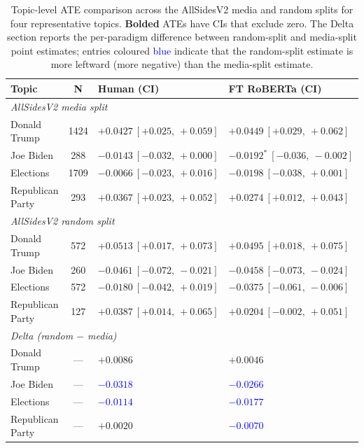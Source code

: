 \begin{table}[ht]
  \centering
  \small
  \begin{tabular}{l c l l}
    \toprule
    \textbf{Topic} & \textbf{N} & \textbf{Human (CI)} & \textbf{FT RoBERTa (CI)} \\
    \midrule
    \multicolumn{4}{l}{\textit{AllSidesV2 media split}} \\
    Donald Trump     & \num{1424} & $\mathbf{+0.0427}\ [+0.025,\ +0.059]$ & $\mathbf{+0.0449}\ [+0.029,\ +0.062]$ \\
    Joe Biden        & 288        & $-0.0143\ [-0.032,\ +0.000]$ & $\mathbf{-0.0192^{*}}\ [-0.036,\ -0.002]$ \\
    Elections        & \num{1709} & $-0.0066\ [-0.023,\ +0.016]$ & $-0.0198\ [-0.038,\ +0.001]$ \\
    Republican Party & 293        & $\mathbf{+0.0367}\ [+0.023,\ +0.052]$ & $\mathbf{+0.0274}\ [+0.012,\ +0.043]$ \\
    \midrule
    \multicolumn{4}{l}{\textit{AllSidesV2 random split}} \\
    Donald Trump     & 572        & $\mathbf{+0.0513}\ [+0.017,\ +0.073]$ & $\mathbf{+0.0495}\ [+0.018,\ +0.075]$ \\
    Joe Biden        & 260        & $\mathbf{-0.0461}\ [-0.072,\ -0.021]$ & $\mathbf{-0.0458}\ [-0.073,\ -0.024]$ \\
    Elections        & 572        & $-0.0180\ [-0.042,\ +0.019]$ & $\mathbf{-0.0375}\ [-0.061,\ -0.006]$ \\
    Republican Party & 127        & $\mathbf{+0.0387}\ [+0.014,\ +0.065]$ & $+0.0204\ [-0.002,\ +0.051]$ \\
    \midrule
    \multicolumn{4}{l}{\textit{Delta (random $-$ media)}} \\
    Donald Trump     & --- & $+0.0086$ & $+0.0046$ \\
    Joe Biden        & --- & \textcolor{blue}{$-0.0318$} & \textcolor{blue}{$-0.0266$} \\
    Elections        & --- & \textcolor{blue}{$-0.0114$} & \textcolor{blue}{$-0.0177$} \\
    Republican Party & --- & $+0.0020$ & \textcolor{blue}{$-0.0070$} \\
    \bottomrule
  \end{tabular}
  \caption{Topic-level ATE comparison across the AllSidesV2 media and random splits for four representative topics. \textbf{Bolded} ATEs have CIs that exclude zero. The Delta section reports the per-paradigm difference between random-split and media-split point estimates; entries coloured \textcolor{blue}{blue} indicate that the random-split estimate is more leftward (more negative) than the media-split estimate.}
  \label{tab:random-topic-delta}
\end{table}

